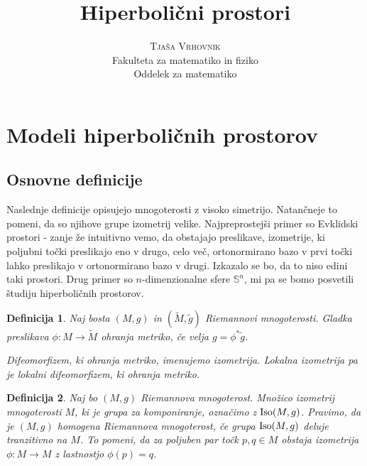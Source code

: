 \documentclass[a4paper]{article}
\newtheorem{definicija}{Definicija}
\begin{document}
\title{\Huge\textbf{Hiperbolični prostori}} 
\author{\large\textsc{Tjaša Vrhovnik}\\
	Fakulteta za matematiko in fiziko\\
	Oddelek za matematiko}

\thispagestyle{empty}

\maketitle

\newpage

\tableofcontents

\newpage

\section{Modeli hiperboličnih prostorov}
\subsection{Osnovne definicije}

Naslednje definicije opisujejo mnogoterosti z visoko simetrijo. Natančneje to pomeni, da so njihove grupe izometrij velike. Najpreprostejši primer so Evklidski prostori - zanje že intuitivno vemo, da obstajajo preslikave, izometrije, ki poljubni točki preslikajo eno v drugo, celo več, ortonormirano bazo v prvi točki lahko preslikajo v ortonormirano bazo v drugi. Izkazalo se bo, da to niso edini taki prostori. Drug primer so $n$-dimenzionalne sfere $\mathbb{S}^{n}$, mi pa se bomo posvetili študiju hiperboličnih prostorov.

\begin{definicija}
Naj bosta $(M,g)$ in $(\tilde{M}, \tilde{g})$ Riemannovi mnogoterosti. Gladka preslikava $\phi \colon M \to \tilde{M}$ \emph{ohranja metriko}, če velja $g = \phi^{*}\tilde{g}$.

Difeomorfizem, ki ohranja metriko, imenujemo \emph{izometrija}. \emph{Lokalna izometrija} pa je lokalni difeomorfizem, ki ohranja metriko. 
\end{definicija}

\begin{definicija}
Naj bo $(M,g)$ Riemannova mnogoterost. Množico izometrij mnogoterosti $M$, ki je grupa za komponiranje, označimo z $\textup{Iso}(M,g)$.
Pravimo, da je $(M,g)$ \emph{homogena Riemannova mnogoterost}, če grupa $\textup{Iso}(M,g)$ deluje tranzitivno na $M$. To pomeni, da za poljuben par točk $p,q \in M$ obstaja izometrija $\phi \colon M \to M$ z lastnostjo $\phi(p)=q$.
\end{definicija}
\end{document}
